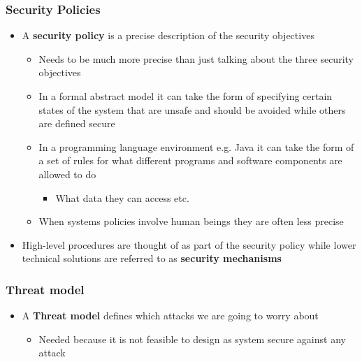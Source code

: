\documentclass[11pt]{article}
\begin{document}
\subsubsection{Security Policies}
\label{sec:orgb82cc89}
\begin{itemize}
\item A \textbf{security policy} is a precise description of the security objectives
\begin{itemize}
\item Needs to be much more precise than just talking about the three security objectives
\item In a formal abstract model it can take the form of specifying certain states of the system that are unsafe and should be avoided while others are defined secure
\item In a programming language environment e.g. Java it can take the form of a set of rules for what different programs and software components are allowed to do
\begin{itemize}
\item What data they can access etc.
\end{itemize}
\item When systems policies involve human beings they are often less precise
\end{itemize}

\item High-level procedures are thought of as part of the security policy while lower technical solutions are referred to as \textbf{security mechanisms}
\end{itemize}

\subsubsection{Threat model}
\label{sec:org7d4ffeb}
\begin{itemize}
\item A \textbf{Threat model} defines which attacks we are going to worry about
\begin{itemize}
\item Needed because it is not feasible to design as system secure against any attack
\end{itemize}
\end{itemize}
\end{document}
